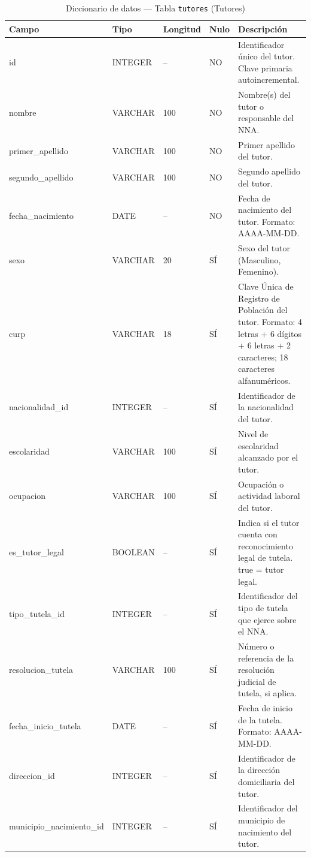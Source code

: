 \begin{table}[H]
	\centering
	\caption{Diccionario de datos --- Tabla \texttt{tutores} (Tutores)}
	\label{tab:data-dict-tutores}
	\scriptsize
	\begin{tabular}{>{\ttfamily\raggedright\arraybackslash}p{3.6cm} p{1.6cm} p{1.3cm} p{0.7cm} p{5.6cm}}
		\toprule
		\textbf{Campo} & \textbf{Tipo} & \textbf{Longitud} & \textbf{Nulo} & \textbf{Descripción} \\
		\midrule
		id & INTEGER & -- & NO & Identificador único del tutor. Clave primaria autoincremental. \\
		nombre & VARCHAR & 100 & NO & Nombre(s) del tutor o responsable del NNA. \\
		primer\_apellido & VARCHAR & 100 & NO & Primer apellido del tutor. \\
		segundo\_apellido & VARCHAR & 100 & NO & Segundo apellido del tutor. \\
		fecha\_nacimiento & DATE & -- & NO & Fecha de nacimiento del tutor. Formato: AAAA-MM-DD. \\
		sexo & VARCHAR & 20 & SÍ & Sexo del tutor (Masculino, Femenino). \\
		curp & VARCHAR & 18 & SÍ & Clave Única de Registro de Población del tutor. Formato: 4 letras + 6 dígitos + 6 letras + 2 caracteres; 18 caracteres alfanuméricos. \\
		nacionalidad\_id & INTEGER & -- & SÍ & Identificador de la nacionalidad del tutor. \\
		escolaridad & VARCHAR & 100 & SÍ & Nivel de escolaridad alcanzado por el tutor. \\
		ocupacion & VARCHAR & 100 & SÍ & Ocupación o actividad laboral del tutor. \\
		es\_tutor\_legal & BOOLEAN & -- & SÍ & Indica si el tutor cuenta con reconocimiento legal de tutela. true = tutor legal. \\
		tipo\_tutela\_id & INTEGER & -- & SÍ & Identificador del tipo de tutela que ejerce sobre el NNA. \\
		resolucion\_tutela & VARCHAR & 100 & SÍ & Número o referencia de la resolución judicial de tutela, si aplica. \\
		fecha\_inicio\_tutela & DATE & -- & SÍ & Fecha de inicio de la tutela. Formato: AAAA-MM-DD. \\
		direccion\_id & INTEGER & -- & SÍ & Identificador de la dirección domiciliaria del tutor. \\
		municipio\_nacimiento\_id & INTEGER & -- & SÍ & Identificador del municipio de nacimiento del tutor. \\
		\bottomrule
	\end{tabular}
\end{table}

